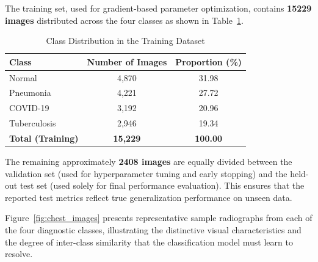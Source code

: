 The training set, used for gradient-based parameter optimization, contains \textbf{\num{15229} images} distributed across the four classes as shown in Table~\ref{tab:class_distribution}.

\begin{table}[htbp]
	\centering
	\caption{Class Distribution in the Training Dataset}
	\label{tab:class_distribution}
	\renewcommand{\arraystretch}{1.2}
	\begin{tabular}{|l|c|c|}
		\hline
		\textbf{Class} & \textbf{Number of Images} & \textbf{Proportion (\%)} \\
		\hline
		Normal & 4,870 & 31.98 \\
		\hline
		Pneumonia & 4,221 & 27.72 \\
		\hline
		COVID-19 & 3,192 & 20.96 \\
		\hline
		Tuberculosis & 2,946 & 19.34 \\
		\hline
		\textbf{Total (Training)} & \textbf{15,229} & \textbf{100.00} \\
		\hline
	\end{tabular}
\end{table}

The remaining approximately \textbf{\num{2408} images} are equally divided between the validation set (used for hyperparameter tuning and early stopping) and the held-out test set (used solely for final performance evaluation). This ensures that the reported test metrics reflect true generalization performance on unseen data.

Figure~\ref{fig:chest_images} presents representative sample radiographs from each of the four diagnostic classes, illustrating the distinctive visual characteristics and the degree of inter-class similarity that the classification model must learn to resolve.

